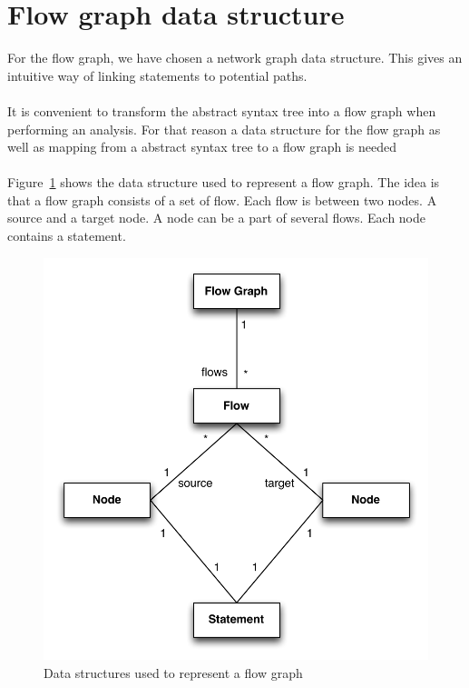\section{Flow graph data structure}
\label{sec:constructing_flow_graphs}
For the flow graph, we have chosen a network graph data structure. This gives an intuitive way of linking statements to potential paths.
\\
\\
It is convenient to transform the abstract syntax tree into a flow graph when performing an analysis. For that reason a data structure for the flow graph as well as mapping from a abstract syntax tree to a flow graph is needed 
\\
\\
Figure~\ref{fig:flowgraph} shows the data structure used to represent a flow graph. The idea is that a flow graph consists of a set of flow. Each flow is between two nodes. A source and a target node. A node can be a part of several flows. Each node contains a statement.	

\begin{figure}[h]
	\centering
	\includegraphics[scale=0.6]{../img/flow_graph}
	\caption{Data structures used to represent a flow graph}
	\label{fig:flowgraph}
\end{figure}

